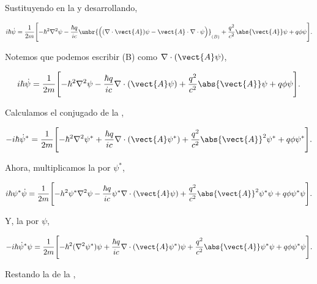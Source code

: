 \documentclass[../main.tex]{subfiles}
\begin{document}
Sustituyendo en la  y desarrollando,

\begin{equation*}
	i\hbar \dot{\psi} = \dfrac{1}{2m}\Biggl[-\hbar^{2}\nabla^{2}{\psi} - \dfrac{\hbar q}{ic}\unbr{ \Bigl((\nabla \cdot{\vect{A}})\psi - \vect{A}\cdot\nabla \cdot{\psi}\Bigr) }_{(B)} + \dfrac{q^{2}}{c^{2}}\abs{\vect{A}}\psi + q\phi\psi\Biggr].
\end{equation*}

\pagebreak
Notemos que podemos escribir (B) como \(\nabla \cdot{(\vect{A}\psi)}\),

\begin{equation}
	i\hbar \dot{\psi} = \dfrac{1}{2m}\Biggl[-\hbar^{2}\nabla^{2}{\psi} - \dfrac{\hbar q}{ic}\nabla \cdot{(\vect{A}\psi)} + \dfrac{q^{2}}{c^{2}}\abs{\vect{A}}\psi + q\phi\psi\Biggr].
	\label{eq:Schrodinger-computed}
\end{equation}

Calculamos el conjugado de la ,

\begin{equation}
	-i\hbar \dot{\psi}^{*} = \dfrac{1}{2m}\Biggl[-\hbar^{2}\nabla^{2}{\psi^{*}} + \dfrac{\hbar q}{ic}\nabla \cdot{(\vect{A}\psi^{*})} + \dfrac{q^{2}}{c^{2}}\abs{\vect{A}}^{2}\psi^{*} + q\phi\psi^{*}\Biggr].
	\label{eq:Schrodinger-conjugate}
\end{equation}

Ahora, multiplicamos la  por \(\psi^{*}\),

\begin{equation}
	i\hbar\psi^{*}\dot{\psi} = \dfrac{1}{2m}\Biggl[-h^{2}\psi^{*}\nabla^{2}{\psi} - \dfrac{\hbar q}{ic}\psi^{*}\nabla \cdot{(\vect{A}\psi)} + \dfrac{q^{2}}{c^{2}}\abs{\vect{A}}^{2}\psi^{*}\psi + q\phi\psi^{*}\psi\Biggr].
	\label{eq:Schrodinger-computed-product}
\end{equation}

Y, la  por \(\psi\),

\begin{equation}
	-i\hbar \dot{\psi}^{*}\psi = \dfrac{1}{2m}\Biggl[-\hbar^{2}(\nabla^{2}{\psi^{*}})\psi + \dfrac{\hbar q}{ic}\nabla \cdot{(\vect{A}\psi^{*})}\psi + \dfrac{q^{2}}{c^{2}}\abs{\vect{A}}\psi^{*}\psi + q\phi\psi^{*}\psi\Biggr].
	\label{eq:Schrodinger-conjugate-product}
\end{equation}

Restando la  de la ,
\end{document}
